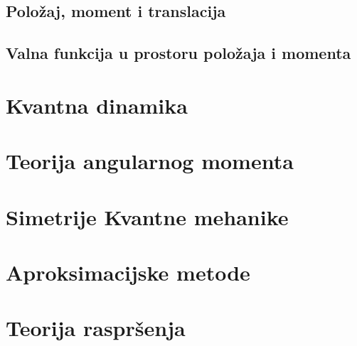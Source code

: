 \documentclass{article}
\numberwithin{equation}{section}
\begin{document}
\subsection{Položaj, moment i translacija}

\subsection{Valna funkcija u prostoru položaja i momenta}




\section{Kvantna dinamika}

\section{Teorija angularnog momenta}

\section{Simetrije Kvantne mehanike}

\section{Aproksimacijske metode}

\section{Teorija raspršenja}
\end{document}
